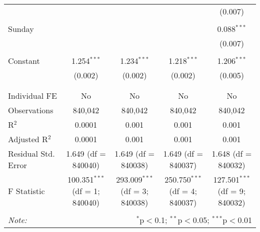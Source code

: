 \documentclass[
]{article}
\begin{document}
\begin{table}[!htbp]
{\begin{tabular}{@{\extracolsep{5pt}}lcccc}
  &  &  &  & (0.007) \\ 
  & & & & \\ 
 Sunday &  &  &  & 0.088$^{***}$ \\ 
  &  &  &  & (0.007) \\ 
  & & & & \\ 
 Constant & 1.254$^{***}$ & 1.234$^{***}$ & 1.218$^{***}$ & 1.206$^{***}$ \\ 
  & (0.002) & (0.002) & (0.002) & (0.005) \\ 
  & & & & \\ 
\hline \\[-1.8ex] 
Individual FE & No & No & No & No \\ 
Observations & 840,042 & 840,042 & 840,042 & 840,042 \\ 
R$^{2}$ & 0.0001 & 0.001 & 0.001 & 0.001 \\ 
Adjusted R$^{2}$ & 0.0001 & 0.001 & 0.001 & 0.001 \\ 
Residual Std. Error & 1.649 (df = 840040) & 1.649 (df = 840038) & 1.649 (df = 840037) & 1.648 (df = 840032) \\ 
F Statistic & 100.351$^{***}$ (df = 1; 840040) & 293.009$^{***}$ (df = 3; 840038) & 250.750$^{***}$ (df = 4; 840037) & 127.501$^{***}$ (df = 9; 840032) \\ 
\hline 
\hline \\[-1.8ex] 
\textit{Note:}  & \multicolumn{4}{r}{$^{*}$p$<$0.1; $^{**}$p$<$0.05; $^{***}$p$<$0.01} \\ 
\end{tabular}
} 
\end{table} 
\newpage
\end{document}
